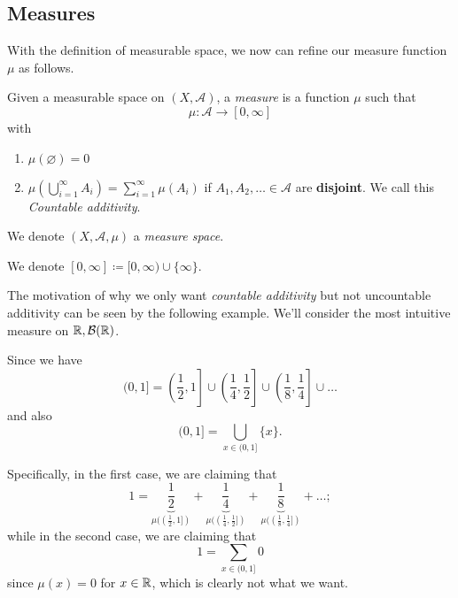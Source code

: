 \subsection{Measures}
With the definition of measurable space, we now can refine our measure function \(\mu\) as follows.
\begin{definition}\label{def:measure}
	Given a measurable space on \((X, \mathcal{A}) \), a \emph{measure} is a function \(\mu\) such that
	\[
		\mu\colon \mathcal{A} \to [0, \infty]
	\]
	with
	\begin{enumerate}
		\item\label{def:measure-empty-measure} \(\mu(\varnothing ) = 0\)
		\item\label{def:measure-countable-additivity} \(\mu\left(\bigcup\limits_{i=1}^{\infty} A_{i}\right) = \sum\limits_{i=1}^{\infty}\mu(A_{i})\) if \(A_1, A_2, \ldots \in \mathcal{A}\)
		are \textbf{disjoint}. We call this \emph{Countable additivity}.
	\end{enumerate}
	We denote \((X, \mathcal{A} , \mu)\) a \emph{measure space}\label{def:measure-space}.
\end{definition}

\begin{notation}
	We denote \([0, \infty] \coloneqq [0, \infty) \cup \{\infty\}\).
\end{notation}

\begin{remark}
	The motivation of why we only want \emph{countable additivity} but not uncountable additivity can be seen by the following example. We'll consider
	the most intuitive measure on \(\mathbb{\MakeUppercase{R}} , \mathcal{B} (\mathbb{\MakeUppercase{R}})\).

	Since we have
	\[
		(0, 1] = \left.\left(\frac{1}{2}, 1\right.\right]\cup \left.\left(\frac{1}{4}, \frac{1}{2}\right.\right]\cup \left.\left(\frac{1}{8}, \frac{1}{4}\right.\right]\cup \ldots
	\]
	and also
	\[
		(0, 1] = \bigcup\limits_{x\in (0, 1]}\{x\}.
	\]

	Specifically, in the first case, we are claiming that
	\[
		1 = \underbrace{\frac{1}{2}}_{\mu((\frac{1}{2}, 1])} + \underbrace{\frac{1}{4}}_{\mu((\frac{1}{4}, \frac{1}{2}])} + \underbrace{\frac{1}{8}}_{\mu((\frac{1}{8}, \frac{1}{4}])}  + \ldots  ;
	\]
	while in the second case, we are claiming that
	\[
		1 = \sum\limits_{x\in(0, 1]} 0
	\]
	since \(\mu(x) = 0\) for \(x\in \mathbb{\MakeUppercase{R}} \), which is clearly not what we want.
\end{remark}

